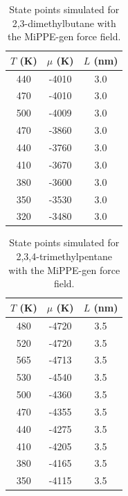 \documentclass[journal=jctc,manuscript=article]{achemso}
\begin{document}
\begin{table}[htb!]
	\caption{State points simulated for 2,3-dimethylbutane with the MiPPE-gen force field.}
	\begin{center}
		\begin{tabular}{|c|c|c|}
			\hline
			$T$ (K) & $\mu$ (K) & $L$ (nm) \\ \hline
			440	&	-4010	&	3.0	\\
			470	&	-4010	&	3.0	\\
			500	&	-4009	&	3.0	\\
			470	&	-3860	&	3.0	\\
			440	&	-3760	&	3.0	\\
			410	&	-3670	&	3.0	\\
			380	&	-3600	&	3.0	\\
			350	&	-3530	&	3.0	\\
			320	&	-3480	&	3.0	\\
			\hline
		\end{tabular}
	\end{center}
\end{table}

\begin{table}[htb!]
	\caption{State points simulated for 2,3,4-trimethylpentane with the MiPPE-gen force field.}
	\begin{center}
		\begin{tabular}{|c|c|c|}
			\hline
			$T$ (K) & $\mu$ (K) & $L$ (nm) \\ \hline
			480	&	-4720	&	3.5	\\
			520	&	-4720	&	3.5	\\
			565	&	-4713	&	3.5	\\
			530	&	-4540	&	3.5	\\
			500	&	-4360	&	3.5	\\
			470	&	-4355	&	3.5	\\
			440	&	-4275	&	3.5	\\
			410	&	-4205	&	3.5	\\
			380	&	-4165	&	3.5	\\
			350	&	-4115	&	3.5	\\
			\hline
		\end{tabular}
	\end{center}
\end{table}
\end{document}

